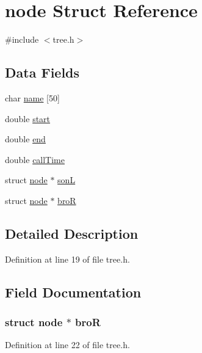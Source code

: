 \hypertarget{structnode}{\section{node Struct Reference}
\label{structnode}
}


{\ttfamily \#include $<$tree.\-h$>$}

\subsection*{Data Fields}
\begin{DoxyCompactItemize}
\item 
char \hyperlink{structnode_ae5cb967283dbbdf75cb2032c1fa08fee}{name} \mbox{[}50\mbox{]}
\item 
double \hyperlink{structnode_a45314566a84a31f43e6435d1eb24d4ec}{start}
\item 
double \hyperlink{structnode_a2c6c1302fc577e5e226869e3b899043e}{end}
\item 
double \hyperlink{structnode_ae9d5b3daa2a3e10c61e3de2c31021246}{call\-Time}
\item 
struct \hyperlink{structnode}{node} $\ast$ \hyperlink{structnode_a814872150cee74a97437edbe9d872806}{son\-L}
\item 
struct \hyperlink{structnode}{node} $\ast$ \hyperlink{structnode_a4deeb6ae7325b3eb630c82b8bd0c466b}{bro\-R}
\end{DoxyCompactItemize}


\subsection{Detailed Description}


Definition at line 19 of file tree.\-h.



\subsection{Field Documentation}
\hypertarget{structnode_a4deeb6ae7325b3eb630c82b8bd0c466b}{
\subsubsection[{bro\-R}]{\setlength{\rightskip}{0pt plus 5cm}struct {\bf node} $\ast$ bro\-R}}\label{structnode_a4deeb6ae7325b3eb630c82b8bd0c466b}


Definition at line 22 of file tree.\-h.

